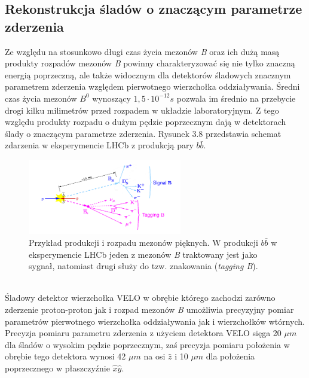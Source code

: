 \documentclass{pracamgr}
\begin{document}
\subsection{Rekonstrukcja śladów o znaczącym parametrze zderzenia}
Ze względu na stosunkowo długi czas życia mezonów \textit{B} oraz ich dużą masą produkty rozpadów mezonów \textit{B} powinny charakteryzować się nie tylko znaczną energią poprzeczną, ale także widocznym dla detektorów śladowych znacznym parametrem zderzenia względem pierwotnego wierzchołka oddziaływania. Średni czas życia mezonów $B^0$ wynoszący $1,5\cdot 10^{-12}s$ pozwala im średnio na przebycie drogi kilku milimetrów przed rozpadem w układzie laboratoryjnym. Z tego względu produkty rozpadu o dużym pędzie poprzecznym dają w detektorach ślady o znaczącym parametrze zderzenia. Rysunek 3.8 przedstawia schemat zdarzenia w eksperymencie LHCb z produkcją pary $b\bar{b}$.\\
\begin{figure}[!h]
 \centering
 \includegraphics[width=0.6\textwidth]{rysunki/collision.png}
 \caption{Przykład produkcji i rozpadu mezonów pięknych. W produkcji $b\bar{b}$ w eksperymencie LHCb jeden z mezonów \textit{B} traktowany jest jako sygnał, natomiast drugi służy do tzw. znakowania (\textit{tagging B}).}
\end{figure}
\\
\noindent
Śladowy detektor wierzchołka VELO w obrębie którego zachodzi zarówno zderzenie proton-proton jak i rozpad mezonów \textit{B} umożliwia precyzyjny pomiar parametrów pierwotnego wierzchołka oddziaływania jak i wierzchołków wtórnych. Precyzja pomiaru parametru zderzenia z użyciem detektora VELO sięga 20 $\mu m$ dla śladów o wysokim pędzie poprzecznym, zaś precyzja pomiaru położenia w obrębie tego detektora wynosi 42 $\mu m$ na osi $\hat{z}$ i 10 $\mu m$ dla położenia poprzecznego w płaszczyźnie $\hat{x}\hat{y}$.
\\\\
\noindent
\end{document}
